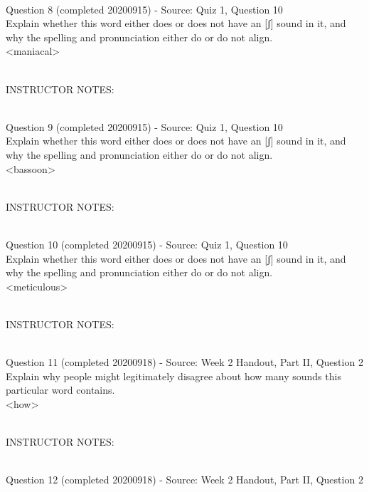 \documentclass[12pt]{article}
\begin{document}
~\\

{\large Question 8} (completed 20200915) - Source: Quiz 1, Question 10\\

Explain whether this word either does or does not have an [ʃ] sound in it, and why the spelling and pronunciation either do or do not align.\\

<maniacal>


~\\
INSTRUCTOR NOTES: 


~\\

{\large Question 9} (completed 20200915) - Source: Quiz 1, Question 10\\

Explain whether this word either does or does not have an [ʃ] sound in it, and why the spelling and pronunciation either do or do not align.\\

<bassoon>


~\\
INSTRUCTOR NOTES: 


~\\

{\large Question 10} (completed 20200915) - Source: Quiz 1, Question 10\\

Explain whether this word either does or does not have an [ʃ] sound in it, and why the spelling and pronunciation either do or do not align.\\

<meticulous>


~\\
INSTRUCTOR NOTES: 


~\\

{\large Question 11} (completed 20200918) - Source: Week 2 Handout, Part II, Question 2\\

Explain why people might legitimately disagree about how many sounds this particular word contains.\\

<how>


~\\
INSTRUCTOR NOTES: 


~\\

{\large Question 12} (completed 20200918) - Source: Week 2 Handout, Part II, Question 2\\
\end{document}
